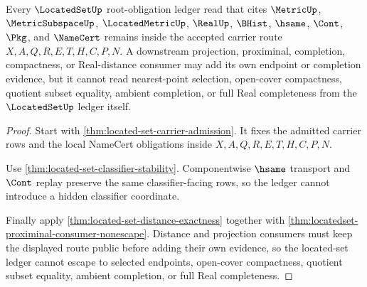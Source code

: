 \begin{theorem}
\label{thm:located-set-ledger-nonescape}
Every $\LocatedSetUp$ root-obligation ledger read that cites $\MetricUp$, $\MetricSubspaceUp$, $\LocatedMetricUp$, $\RealUp$, $\BHist$, $\hsame$, $\Cont$, $\Pkg$, and $\NameCert$ remains inside the accepted carrier route $X,A,Q,R,E,T,H,C,P,N$. A downstream projection, proximinal, completion, compactness, or Real-distance consumer may add its own endpoint or completion evidence, but it cannot read nearest-point selection, open-cover compactness, quotient subset equality, ambient completion, or full Real completeness from the $\LocatedSetUp$ ledger itself.
\end{theorem}
\begin{proof}
Start with \autoref{thm:located-set-carrier-admission}. It fixes the admitted carrier rows and the local NameCert obligations inside $X,A,Q,R,E,T,H,C,P,N$.

Use \autoref{thm:located-set-classifier-stability}. Componentwise $\hsame$ transport and $\Cont$ replay preserve the same classifier-facing rows, so the ledger cannot introduce a hidden classifier coordinate.

Finally apply \autoref{thm:located-set-distance-exactness} together with \autoref{thm:locatedset-proximinal-consumer-nonescape}. Distance and projection consumers must keep the displayed route public before adding their own evidence, so the located-set ledger cannot escape to selected endpoints, open-cover compactness, quotient subset equality, ambient completion, or full Real completeness.
\end{proof}

